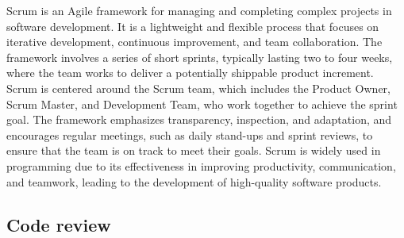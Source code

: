 Scrum is an Agile framework for managing and completing complex projects in software development. It is a lightweight and flexible process that focuses on iterative development, continuous improvement, and team collaboration. \cite{MountainGoatSoftware_scrum_overview} The framework involves a series of short sprints, typically lasting two to four weeks, where the team works to deliver a potentially shippable product increment. Scrum is centered around the Scrum team, which includes the Product Owner, Scrum Master, and Development Team, who work together to achieve the sprint goal. The framework emphasizes transparency, inspection, and adaptation, and encourages regular meetings, such as daily stand-ups and sprint reviews, to ensure that the team is on track to meet their goals. Scrum is widely used in programming due to its effectiveness in improving productivity, communication, and teamwork, leading to the development of high-quality software products. \cite{Stackify_Scrum_benefits}


\subsection{Code review}

